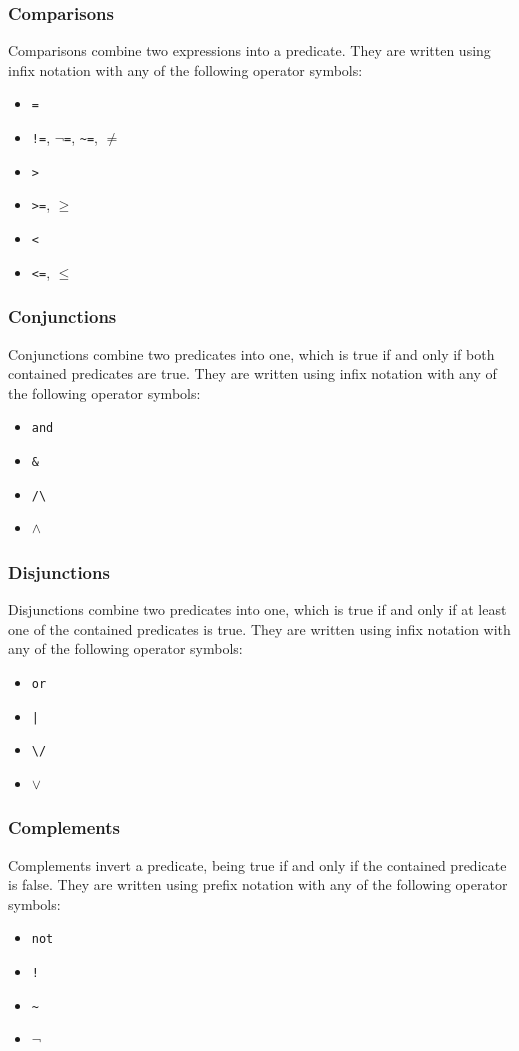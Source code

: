\documentclass{report}
\begin{document}
\subsubsection{Comparisons}
Comparisons combine two expressions into a predicate.
They are written using infix notation with any of the following operator symbols:
\begin{itemize}
    \item \verb+=+
    \item \verb+!=+, \(\lnot\)\verb+=+, \verb+~=+, \(\neq\)
    \item \verb+>+
    \item \verb+>=+, \(\ge\)
    \item \verb+<+
    \item \verb+<=+, \(\le\)
\end{itemize}

\subsubsection{Conjunctions}
Conjunctions combine two predicates into one, which is true if and only if both contained predicates are true.
They are written using infix notation with any of the following operator symbols:
\begin{itemize}
    \item \verb+and+
    \item \verb+&+
    \item \verb+/\+
    \item \(\land\)
\end{itemize}

\subsubsection{Disjunctions}
Disjunctions combine two predicates into one, which is true if and only if at least one of the contained predicates is true.
They are written using infix notation with any of the following operator symbols:
\begin{itemize}
    \item \verb+or+
    \item \verb+|+
    \item \verb+\/+
    \item \(\lor\)
\end{itemize}

\subsubsection{Complements}
Complements invert a predicate, being true if and only if the contained predicate is false.
They are written using prefix notation with any of the following operator symbols:
\begin{itemize}
    \item \verb+not+
    \item \verb+!+
    \item \verb+~+
    \item \(\lnot\)
\end{itemize}
\end{document}

